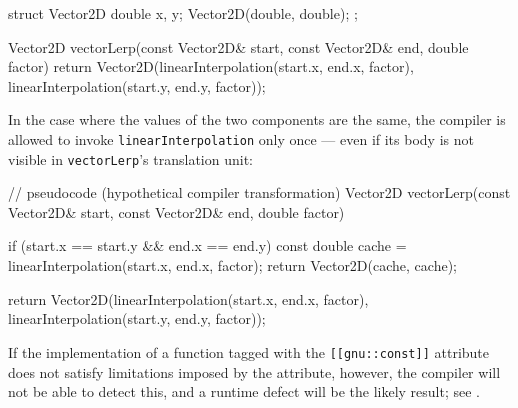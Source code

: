 \begin{emcppshiddenlisting}[emcppsbatch={e7,e8}]
struct Vector2D {
    double x, y;
    Vector2D(double, double);
};
\end{emcppshiddenlisting}
\begin{emcppslisting}[emcppsbatch=e7]
Vector2D vectorLerp(const Vector2D& start, const Vector2D& end, double factor)
{
    return Vector2D(linearInterpolation(start.x, end.x, factor),
                    linearInterpolation(start.y, end.y, factor));
}
\end{emcppslisting}

\noindent In the case where the values of the two components
are the same, the compiler is allowed to invoke
\lstinline!linearInterpolation! only once --- even if its body is not
visible in \lstinline!vectorLerp!'s translation unit:

\begin{emcppslisting}[emcppsbatch=e8]
// pseudocode (hypothetical compiler transformation)
Vector2D vectorLerp(const Vector2D& start, const Vector2D& end, double factor)
{
    if (start.x == start.y && end.x == end.y)
    {
        const double cache = linearInterpolation(start.x, end.x, factor);
        return Vector2D(cache, cache);
    }

    return Vector2D(linearInterpolation(start.x, end.x, factor),
                    linearInterpolation(start.y, end.y, factor));
}
\end{emcppslisting}

\noindent If the implementation of a function tagged with the
\lstinline![[gnu::const]]! attribute does not satisfy limitations imposed by
the attribute, however, the compiler will not be able to detect this, and a runtime
defect will be the likely result;
  see .

